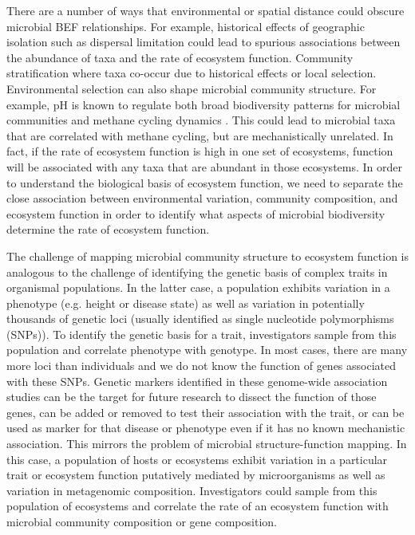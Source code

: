 \documentclass{article}
\begin{document}
There are a number of ways that environmental or spatial distance could obscure
microbial BEF relationships. For example, historical effects of geographic
isolation such as dispersal limitation could lead to spurious associations
between the abundance of taxa and the rate of ecosystem function. Community
stratification where taxa co-occur due to historical effects or local selection.
Environmental selection can also shape microbial community
structure. For example, pH is known to regulate both broad biodiversity patterns for
microbial communities \citep{fierer2006} and methane cycling dynamics
\citep{ye2012}. This could lead to microbial taxa that are correlated with
methane cycling, but are mechanistically unrelated. In fact, if the rate of
ecosystem function is high in one set of ecosystems, function will be
associated with any taxa that are abundant in those ecosystems. 
In order to understand the biological basis of ecosystem function, we need to
separate the close association between environmental variation, community
composition, and ecosystem function in order to identify what aspects of
microbial biodiversity determine the rate of ecosystem function.

The challenge of mapping microbial community structure to ecosystem function is
analogous to the challenge of identifying the genetic basis of complex traits in
organismal populations. In the latter case, a population exhibits variation in a
phenotype (e.g. height or disease state) as well as variation in potentially
thousands of genetic loci (usually identified as single nucleotide polymorphisms
(SNPs)). To identify the genetic basis for a trait, investigators sample from
this population and correlate phenotype with genotype. In most cases, there are
many more loci than individuals and we do not know the function of genes
associated with these SNPs. Genetic markers identified in these genome-wide association
studies can be the target for future research to dissect the function of those
genes, can be added or removed to test their association with the trait, or can
be used as marker for that disease or phenotype even if it has no known
mechanistic association. This mirrors the problem of microbial
structure-function mapping. In this case, a population of hosts or ecosystems exhibit
variation in a particular trait or ecosystem function putatively mediated by
microorganisms as well as variation in metagenomic composition. Investigators
could sample from this population of ecosystems and correlate the rate of an
ecosystem function with microbial community composition or gene composition. 
\end{document}
